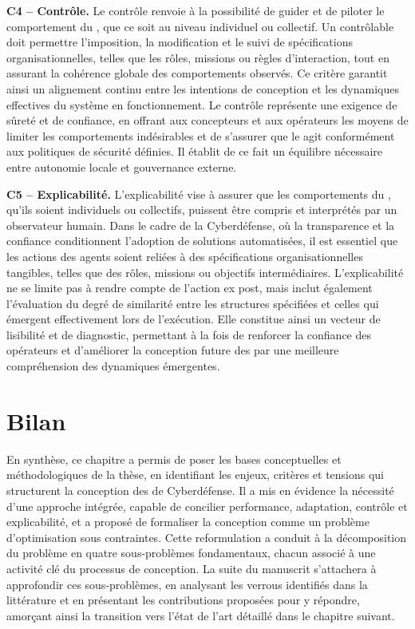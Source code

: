 \medskip

\noindent
\textbf{C4 -- Contrôle.} \quad
Le contrôle renvoie à la possibilité de guider et de piloter le comportement du , que ce soit au niveau individuel ou collectif. Un  contrôlable doit permettre l'imposition, la modification et le suivi de spécifications organisationnelles, telles que les rôles, missions ou règles d'interaction, tout en assurant la cohérence globale des comportements observés. Ce critère garantit ainsi un alignement continu entre les intentions de conception et les dynamiques effectives du système en fonctionnement. Le contrôle représente une exigence de sûreté et de confiance, en offrant aux concepteurs et aux opérateurs les moyens de limiter les comportements indésirables et de s'assurer que le  agit conformément aux politiques de sécurité définies. Il établit de ce fait un équilibre nécessaire entre autonomie locale et gouvernance externe.

\medskip

\noindent
\textbf{C5 -- Explicabilité.} \quad
L'explicabilité vise à assurer que les comportements du , qu'ils soient individuels ou collectifs, puissent être compris et interprétés par un observateur humain. Dans le cadre de la Cyberdéfense, où la transparence et la confiance conditionnent l'adoption de solutions automatisées, il est essentiel que les actions des agents soient reliées à des spécifications organisationnelles tangibles, telles que des rôles, missions ou objectifs intermédiaires. L'explicabilité ne se limite pas à rendre compte de l'action ex post, mais inclut également l'évaluation du degré de similarité entre les structures spécifiées et celles qui émergent effectivement lors de l'exécution. Elle constitue ainsi un vecteur de lisibilité et de diagnostic, permettant à la fois de renforcer la confiance des opérateurs et d'améliorer la conception future des  par une meilleure compréhension des dynamiques émergentes.

\section*{Bilan}
En synthèse, ce chapitre a permis de poser les bases conceptuelles et méthodologiques de la thèse, en identifiant les enjeux, critères et tensions qui structurent la conception des  de Cyberdéfense. Il a mis en évidence la nécessité d’une approche intégrée, capable de concilier performance, adaptation, contrôle et explicabilité, et a proposé de formaliser la conception comme un problème d’optimisation sous contraintes. Cette reformulation a conduit à la décomposition du problème en quatre sous-problèmes fondamentaux, chacun associé à une activité clé du processus de conception. La suite du manuscrit s’attachera à approfondir ces sous-problèmes, en analysant les verrous identifiés dans la littérature et en présentant les contributions proposées pour y répondre, amorçant ainsi la transition vers l’état de l’art détaillé dans le chapitre suivant.

